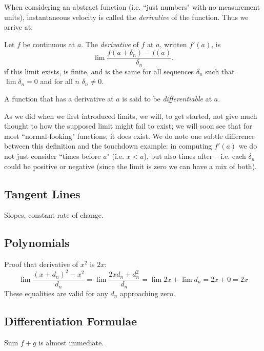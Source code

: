 When considering an abstract function (i.e. ``just numbers" with no measurement units), instantaneous velocity is called the \emph{derivative} of the function. Thus we arrive at:
\begin{defn}\label{def:derivative}
Let $f$ be continuous at $a$. The \emph{derivative} of $f$ at $a$, written $f'(a)$, is
\[
\lim \frac{f(a+\delta_n) - f(a)}{\delta_n}. 
\]
if this limit exists, is finite, and is the same for all sequences $\delta_n$ such that $\lim \delta_n = 0$ and for all $n$ $\delta_n \neq 0$.
\end{defn}
A function that has a derivative at $a$ is said to be \emph{differentiable} at $a$.

As we did when we first introduced limits, we will, to get started, not give much thought to how the supposed limit might fail to exist; we will soon see that for most ``normal-looking" functions, it does exist. We do note one 
subtle difference between this definition and the touchdown example: in computing $f'(a)$ we do not just consider ``times before $a$" (i.e. $x<a$), but also times after -- i.e. each $\delta_n$ could be positive or negative (since the limit is zero we can have a mix of both). 

\subsection{Tangent Lines}
{\color{red}Slopes, constant rate of change.}

\subsection{Polynomials}
Proof that derivative of $x^2$ is $2x$:
\[
\lim \frac{(x+d_n)^2 - x^2}{d_n} = \lim\frac{2xd_n + d_n^2}{d_n} = \lim 2x + \lim d_n = 2x + 0 = 2x
\]
These equalities are valid for any $d_n$ approaching zero.



\subsection{Differentiation Formulae}
Sum $f+g$ is almost immediate.

